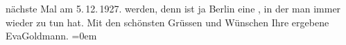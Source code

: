 \begin{ledgroupsized}[t]{13cm}
{{{                  nächste Mal am 5. 12. 1927.}}}\label{K_L03542-3h} werden, denn \label{K_L03542-2v}\label{K_L03542-2h} ist ja Berlin eine \label{T_L03542-1v}\label{T_L03542-1h}, in der man immer wieder zu tun hat.\pend
           \pstart
           Mit den schönsten Grüssen und Wünschen Ihre ergebene {\\[\baselineskip]}\spacefill\mbox{EvaGoldmann.}\pend
           \leftskip=0em{}
         
         \endnumbering{}\end{ledgroupsized}\begin{anhang}\end{anhang}\newcommand{\dateiname}{L03542}\newcommand{\titel}{Eva Marie Goldmann an Arthur Schnitzler, 1. 1. 1927}\newcommand{\editorInnen}{Martin Anton Müller und Laura Untner}
      
